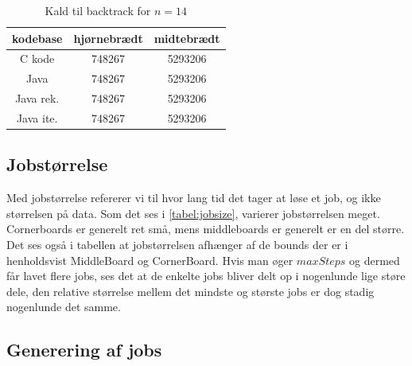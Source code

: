 \begin{table}
\begin{center}
\begin{tabular}{|c|c|c|}
\hline kodebase  & hjørnebrædt & midtebrædt \\
\hline C kode    &  748267           &  5293206           \\
\hline Java      &  748267           &  5293206           \\
\hline Java rek. &  748267           &  5293206           \\
\hline Java ite. &  748267           &  5293206           \\
\hline
\end{tabular}
\caption{Kald til backtrack for $n=14$}
\label{table:backtrackkald}
\end{center}
\end{table}

\subsection{Jobstørrelse}

Med jobstørrelse refererer vi til hvor lang tid det tager at løse et job, og
ikke størrelsen på data. 
Som det ses i \ref{tabel:jobsize}, varierer jobstørrelsen
meget. Cornerboards er generelt ret små, mens middleboards er generelt er en del
større. Det ses også i tabellen at jobstørrelsen afhænger af de bounds der er i
henholdsvist MiddleBoard og CornerBoard. Hvis man øger $maxSteps$ og dermed får
lavet flere jobs, ses det at de enkelte jobs bliver delt op i nogenlunde lige
støre dele, den relative størrelse mellem det mindste og største jobs er dog
stadig nogenlunde det samme. 

\subsection{Generering af jobs}

